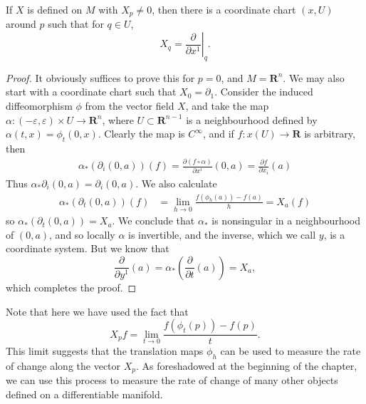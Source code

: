 \begin{theorem}
    If $X$ is defined on $M$ with $X_p \neq 0$, then there is a coordinate chart $(x,U)$ around $p$ such that for $q \in U$,
    \[ X_q = \left. \frac{\partial}{\partial x^1} \right|_q. \]
\end{theorem}
\begin{proof}
    It obviously suffices to prove this for $p = 0$, and $M = \mathbf{R}^n$. We may also start with a coordinate chart such that $X_0 = \partial_1$. Consider the induced diffeomorphism $\phi$ from the vector field $X$, and take the map $\alpha: (-\varepsilon, \varepsilon) \times U \to \mathbf{R}^n$, where $U \subset \mathbf{R}^{n-1}$ is a neighbourhood defined by $\alpha(t,x) = \phi_t(0,x)$. Clearly the map is $C^\infty$, and if $f: x(U) \to \mathbf{R}$ is arbitrary, then
    \begin{align*}
        \alpha_* \left( \partial_i(0,a) \right)(f) = \frac{\partial (f \circ \alpha)}{\partial x^i} (0,a) = \frac{\partial f}{\partial x_i}(a)
    \end{align*}
    Thus $\alpha_* \partial_i(0,a) = \partial_i(0,a)$. We also calculate
    \begin{align*}
        \alpha_* \left( \partial_t(0,a) \right) (f) &= \lim_{h \to 0} \frac{f(\phi_{h}(a)) - f(a)}{h} = X_a(f)
    \end{align*}
    so $\alpha_*(\partial_t(0,a)) = X_a$. We conclude that $\alpha_*$ is nonsingular in a neighbourhood of $(0,a)$, and so locally $\alpha$ is invertible, and the inverse, which we call $y$, is a coordinate system. But we know that
    \[ \frac{\partial}{\partial y^1}(a) = \alpha_* \left( \frac{\partial}{\partial t}(a) \right) = X_a, \]
    which completes the proof.
\end{proof}

Note that here we have used the fact that
%
\[ X_p f = \lim_{t \to 0} \frac{f(\phi_t(p)) - f(p)}{t}. \]
%
This limit suggests that the translation maps $\phi_h$ can be used to measure the rate of change along the vector $X_p$. As foreshadowed at the beginning of the chapter, we can use this process to measure the rate of change of many other objects defined on a differentiable manifold.

